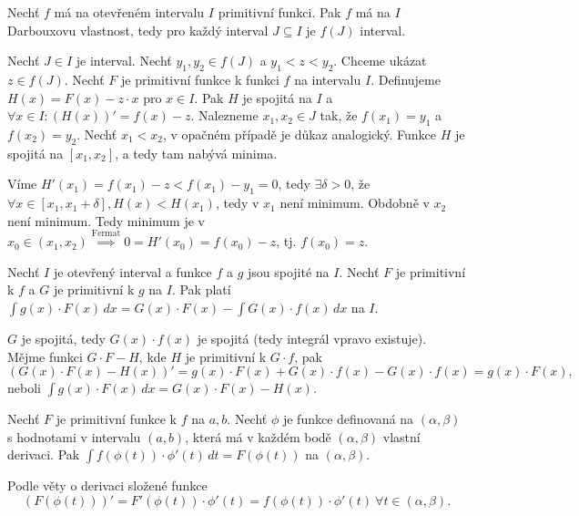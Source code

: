 \documentclass[12pt]{article}                   %
\begin{document}
        \begin{veta}
            Nechť $f$ má na otevřeném intervalu $I$ primitivní funkci. Pak $f$ má na $I$ Darbouxovu vlastnost, tedy pro každý interval $J \subseteq I$ je $f(J)$ interval.

            \begin{dukazin}
                Nechť $J \in I$ je interval. Nechť $y_1, y_2 \in f(J)$ a $y_1 < z < y_2$. Chceme ukázat $z \in f(J)$. Nechť $F$ je primitivní funkce k funkci $f$ na intervalu $I$. Definujeme $H(x) = F(x) - z·x$ pro $x \in I$. Pak $H$ je spojitá na $I$ a $\forall x \in I: (H(x))' = f(x) - z$. Nalezneme $x_1, x_2 \in J$ tak, že $f(x_1) = y_1$ a $f(x_2) = y_2$. Nechť $x_1 < x_2$, v opačném případě je důkaz analogický. Funkce $H$ je spojitá na $[x_1, x_2]$, a tedy tam nabývá minima.

                Víme $H'(x_1) = f(x_1) - z < f(x_1) - y_1 = 0$, tedy $\exists \delta > 0$, že $\forall x \in [x_1, x_1+\delta], H(x) < H(x_1)$, tedy v $x_1$ není minimum. Obdobně v $x_2$ není minimum. Tedy minimum je v $x_0 \in (x_1, x_2) \overset{\text{Fermat}}{\implies} 0 = H'(x_0) = f(x_0) - z$, tj. $f(x_0) = z$.
            \end{dukazin}
        \end{veta}


        \begin{veta}
            Nechť $I$ je otevřený interval a funkce $f$ a $g$ jsou spojité na $I$. Nechť $F$ je primitivní k $f$ a $G$ je primitivní k $g$ na $I$. Pak platí $\int g(x)·F(x)\,dx = G(x)·F(x) - \int G(x)·f(x)\,dx$ na $I$.

            \begin{dukazin}
                $G$ je spojitá, tedy $G(x)·f(x)$ je spojitá (tedy integrál vpravo existuje). Mějme funkci $G·F - H$, kde $H$ je primitivní k $G·f$, pak
                $$ (G(x)·F(x) - H(x))' = g(x)·F(x) + G(x)·f(x) - G(x)·f(x) = g(x)·F(x), $$
                neboli $\int g(x)·F(x)\,dx = G(x)·F(x) - H(x)$.
            \end{dukazin}
        \end{veta}

        \begin{veta}[1. o substituci]
            Nechť $F$ je primitivní funkce k $f$ na $a, b$. Nechť $\phi$ je funkce definovaná na $(\alpha, \beta)$ s hodnotami v intervalu $(a, b)$, která má v každém bodě $(\alpha, \beta)$ vlastní derivaci. Pak $\int f(\phi(t))·\phi'(t)\,dt = F(\phi(t))$ na $(\alpha, \beta)$.

            \begin{dukazin}
                Podle věty o derivaci složené funkce
                $$ (F(\phi(t)))' = F'(\phi(t))·\phi'(t) = f(\phi(t))·\phi'(t)\ \forall t \in (\alpha, \beta). $$ 
            \end{dukazin}
        \end{veta}
\end{document}
